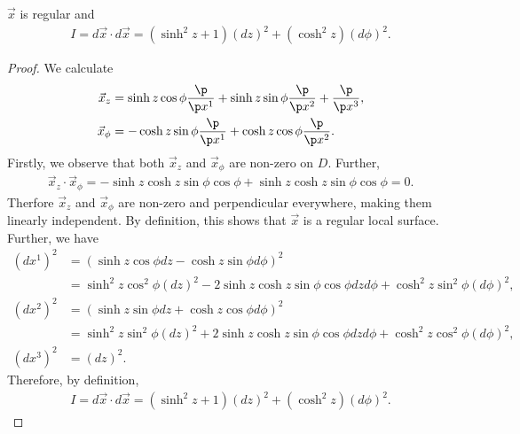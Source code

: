\documentclass{article}
\begin{document}
\begin{claim*}
   $\vec x$ is regular and
   \begin{align*}
      I=d\vec x\cdot d\vec x = (\sinh^2 z + 1)(dz)^2 + (\cosh^2 z) (d\phi)^2.
   \end{align*}
\end{claim*}
\begin{proof}
   We calculate 
   \begin{align}
      \label{dirderiv1}
      \vec x_z &= \sinh z \cos\phi \frac{\p }{\p x^1} 
      + \sinh z \sin\phi \frac{\p }{\p x^2} 
      + \frac{\p }{\p x^3},\\
      \label{dirderiv2}
      \vec x_\phi &= -\cosh z \sin\phi \frac{\p }{\p x^1} 
      + \cosh z\cos\phi\frac{\p }{\p x^2}.
   \end{align}
   Firstly, we observe that both $\vec x_z$ and $\vec x_\phi$ are non-zero on $D$.
   Further,
   \begin{align*}
      \vec x_z \cdot \vec x_\phi = -\sinh z\cosh z\sin\phi\cos\phi + \sinh z\cosh z\sin\phi\cos\phi
      = 0.
   \end{align*}
   Therfore $\vec x_z$ and $\vec x_\phi$ are non-zero and perpendicular everywhere, making them linearly 
   independent. By definition, this shows that $\vec x$ is a regular local surface.
   Further, we have 
   \begin{align*}
      (dx^1)^2 &= (\sinh z\cos\phi dz - \cosh z \sin\phi d\phi)^2\\
      &=\sinh^2 z \cos^2\phi(dz)^2
      -2\sinh z\cosh z\sin\phi\cos\phi dzd\phi+\cosh^2z\sin^2\phi(d\phi)^2,\\
      (dx^2)^2 &= (\sinh z\sin\phi dz + \cosh z \cos\phi d\phi)^2\\
      &=\sinh^2 z\sin^2\phi (dz)^2 + 2\sinh z\cosh z\sin\phi\cos\phi dzd\phi + \cosh^2 z\cos^2\phi(d\phi)^2,\\
      (dx^3)^2 &=(dz)^2.
   \end{align*}
   Therefore, by definition, 
   \begin{align*}
      I=d\vec x\cdot d\vec x = (\sinh^2 z + 1)(dz)^2 + (\cosh^2 z) (d\phi)^2.
   \end{align*}
\end{proof}
\end{document}
